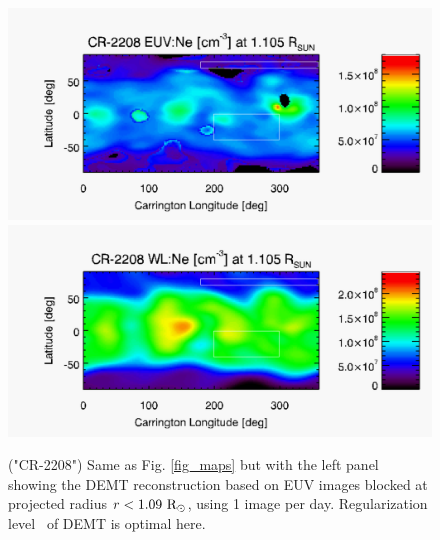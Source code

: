 \documentclass[baaa]{baaa}
\begin{document}
\clearpage

\begin{figure}[]
  \centering
  \includegraphics[width=\columnwidth]{map_Ne_CR2208_l106090_h1_r3D_reduced_1105_Rsun.pdf}
  \includegraphics[width=\columnwidth]{map_x_KCORCR220813imgsbf2ri105ro225_Inst_109_200_120_90_180_dropneg_r3D_l6e-5_1105_Rsun.pdf}
  \caption{("CR-2208") Same as Fig. \ref{fig_maps} but with the left panel showing the DEMT reconstruction based on EUV images blocked at projected radius $r<1.09~\rm{R}_\odot$, using 1 image per day. Regularization level \
of DEMT is optimal here.}
  \label{fig_maps7}
\end{figure}
\end{document}
